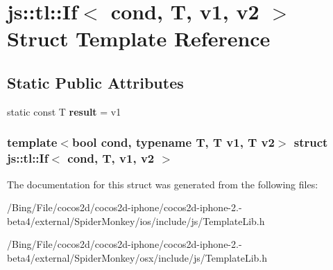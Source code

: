 \hypertarget{structjs_1_1tl_1_1_if}{\section{js\-:\-:tl\-:\-:If$<$ cond, T, v1, v2 $>$ Struct Template Reference}
\label{structjs_1_1tl_1_1_if}
}
\subsection*{Static Public Attributes}
\begin{DoxyCompactItemize}
\item 
\hypertarget{structjs_1_1tl_1_1_if_ac82e45325d8e33123b92e9bd1c2cf708}{static const T {\bfseries result} = v1}\label{structjs_1_1tl_1_1_if_ac82e45325d8e33123b92e9bd1c2cf708}

\end{DoxyCompactItemize}
\subsubsection*{template$<$bool cond, typename T, T v1, T v2$>$ struct js\-::tl\-::\-If$<$ cond, T, v1, v2 $>$}



The documentation for this struct was generated from the following files\-:\begin{DoxyCompactItemize}
\item 
/\-Bing/\-File/cocos2d/cocos2d-\/iphone/cocos2d-\/iphone-\/2.-\/beta4/external/\-Spider\-Monkey/ios/include/js/Template\-Lib.\-h\item 
/\-Bing/\-File/cocos2d/cocos2d-\/iphone/cocos2d-\/iphone-\/2.-\/beta4/external/\-Spider\-Monkey/osx/include/js/Template\-Lib.\-h\end{DoxyCompactItemize}
